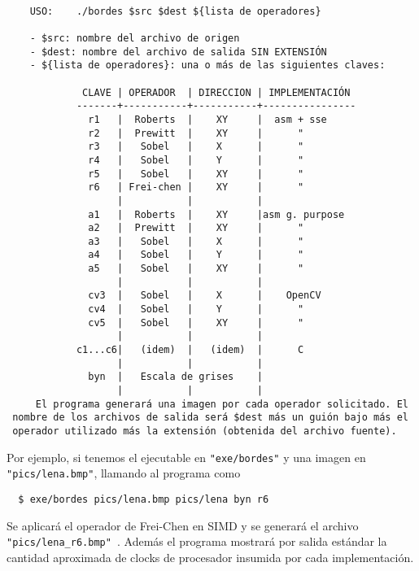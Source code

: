 {\small
\begin{verbatim}    
                                                                      
    USO:    ./bordes $src $dest ${lista de operadores}                
                                                                      
    - $src: nombre del archivo de origen                              
    - $dest: nombre del archivo de salida SIN EXTENSIÓN               
    - ${lista de operadores}: una o más de las siguientes claves:     
                                                                      
             CLAVE | OPERADOR  | DIRECCION | IMPLEMENTACIÓN           
            -------+-----------+-----------+----------------          
              r1   |  Roberts  |    XY     |  asm + sse               
              r2   |  Prewitt  |    XY     |      "                  
              r3   |   Sobel   |    X      |      "                  
              r4   |   Sobel   |    Y      |      "                  
              r5   |   Sobel   |    XY     |      "                  
              r6   | Frei-chen |    XY     |      "                  
                   |           |           |                          
              a1   |  Roberts  |    XY     |asm g. purpose            
              a2   |  Prewitt  |    XY     |      "                  
              a3   |   Sobel   |    X      |      "                  
              a4   |   Sobel   |    Y      |      "                  
              a5   |   Sobel   |    XY     |      "                  
                   |           |           |                          
              cv3  |   Sobel   |    X      |    OpenCV                
              cv4  |   Sobel   |    Y      |      "                  
              cv5  |   Sobel   |    XY     |      "                  
                   |           |           |                          
            c1...c6|   (idem)  |   (idem)  |      C                   
                   |           |           |                          
              byn  |   Escala de grises    |                          
                   |           |           |                          
     El programa generará una imagen por cada operador solicitado. El 
 nombre de los archivos de salida será $dest más un guión bajo más el 
 operador utilizado más la extensión (obtenida del archivo fuente).   
\end{verbatim}  }                                        

Por ejemplo, si tenemos el ejecutable en \verb="exe/bordes"= y una imagen en \verb="pics/lena.bmp"=, llamando al programa como

{\small \verb=  $ exe/bordes pics/lena.bmp pics/lena byn r6 =}

Se aplicará el operador de Frei-Chen en SIMD y se generará el archivo \verb="pics/lena_r6.bmp" =. Además el programa mostrará por salida estándar la cantidad aproximada de clocks de procesador insumida por cada implementación.

    